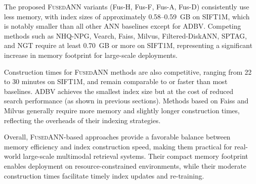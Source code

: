 \documentclass[numbers,sort]{article}
\begin{document}
The proposed \textsc{FusedANN} variants (Fus-H, Fus-F, Fus-A, Fus-D) consistently use less memory, with index sizes of approximately 0.58--0.59~GB on SIFT1M, which is notably smaller than all other ANN baselines except for ADBV. Competing methods such as NHQ-NPG, Vearch, Faiss, Milvus, Filtered-DiskANN, SPTAG, and NGT require at least 0.70~GB or more on SIFT1M, representing a significant increase in memory footprint for large-scale deployments.

Construction times for \textsc{FusedANN} methods are also competitive, ranging from 22 to 30 minutes on SIFT1M, and remain comparable to or faster than most baselines. ADBV achieves the smallest index size but at the cost of reduced search performance (as shown in previous sections). Methods based on Faiss and Milvus generally require more memory and slightly longer construction times, reflecting the overheads of their indexing strategies.

Overall, \textsc{FusedANN}-based approaches provide a favorable balance between memory efficiency and index construction speed, making them practical for real-world large-scale multimodal retrieval systems. Their compact memory footprint enables deployment on resource-constrained environments, while their moderate construction times facilitate timely index updates and re-training.
\end{document}
